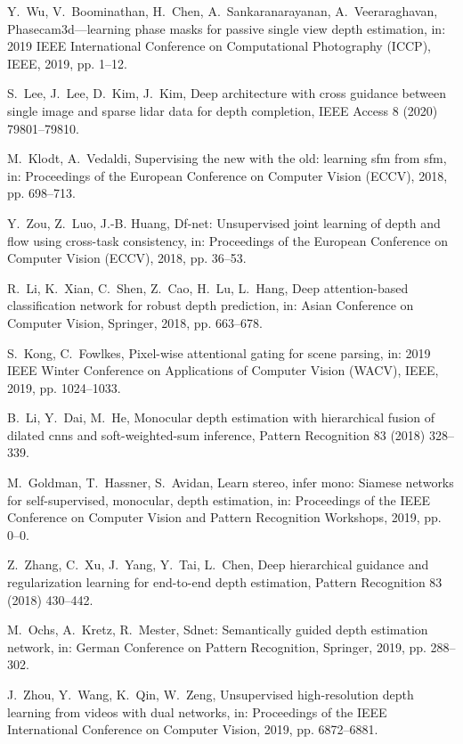\documentclass[5p]{elsarticle}
\begin{document}
\begin{thebibliography}{100}
Y.~Wu, V.~Boominathan, H.~Chen, A.~Sankaranarayanan, A.~Veeraraghavan,
  Phasecam3d—learning phase masks for passive single view depth estimation,
  in: 2019 IEEE International Conference on Computational Photography (ICCP),
  IEEE, 2019, pp. 1--12.

S.~Lee, J.~Lee, D.~Kim, J.~Kim, Deep architecture with cross guidance between
  single image and sparse lidar data for depth completion, IEEE Access 8 (2020)
  79801--79810.

M.~Klodt, A.~Vedaldi, Supervising the new with the old: learning sfm from sfm,
  in: Proceedings of the European Conference on Computer Vision (ECCV), 2018,
  pp. 698--713.

Y.~Zou, Z.~Luo, J.-B. Huang, Df-net: Unsupervised joint learning of depth and
  flow using cross-task consistency, in: Proceedings of the European Conference
  on Computer Vision (ECCV), 2018, pp. 36--53.

R.~Li, K.~Xian, C.~Shen, Z.~Cao, H.~Lu, L.~Hang, Deep attention-based
  classification network for robust depth prediction, in: Asian Conference on
  Computer Vision, Springer, 2018, pp. 663--678.

S.~Kong, C.~Fowlkes, Pixel-wise attentional gating for scene parsing, in: 2019
  IEEE Winter Conference on Applications of Computer Vision (WACV), IEEE, 2019,
  pp. 1024--1033.

B.~Li, Y.~Dai, M.~He, Monocular depth estimation with hierarchical fusion of
  dilated cnns and soft-weighted-sum inference, Pattern Recognition 83 (2018)
  328--339.

M.~Goldman, T.~Hassner, S.~Avidan, Learn stereo, infer mono: Siamese networks
  for self-supervised, monocular, depth estimation, in: Proceedings of the IEEE
  Conference on Computer Vision and Pattern Recognition Workshops, 2019, pp.
  0--0.

Z.~Zhang, C.~Xu, J.~Yang, Y.~Tai, L.~Chen, Deep hierarchical guidance and
  regularization learning for end-to-end depth estimation, Pattern Recognition
  83 (2018) 430--442.

M.~Ochs, A.~Kretz, R.~Mester, Sdnet: Semantically guided depth estimation
  network, in: German Conference on Pattern Recognition, Springer, 2019, pp.
  288--302.

J.~Zhou, Y.~Wang, K.~Qin, W.~Zeng, Unsupervised high-resolution depth learning
  from videos with dual networks, in: Proceedings of the IEEE International
  Conference on Computer Vision, 2019, pp. 6872--6881.


\end{thebibliography}
\end{document}
